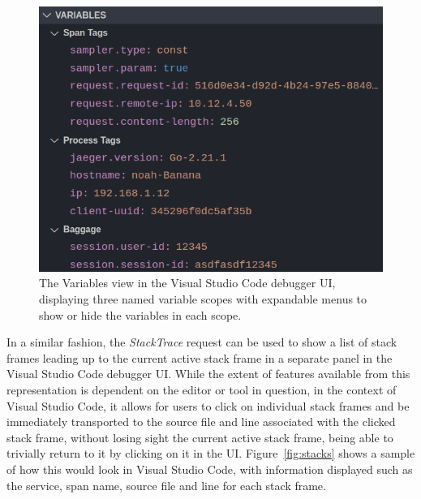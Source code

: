 \documentclass[12pt,pdftex,titlepage]{report}
\begin{document}
            \begin{figure}[htb!]
                \centering
                \includegraphics[scale=1.7]{scopes.png}
                \caption{The Variables view in the Visual Studio Code debugger UI, displaying three named variable scopes with expandable menus to show or hide the variables
                in each scope.}
                \label{fig:scopes}
            \end{figure}

            In a similar fashion, the \textit{StackTrace} request can be used to show a list of stack frames leading up to the current active stack frame in a separate panel in the Visual Studio Code debugger UI. While the extent of 
            features available from this representation is dependent on the editor or tool in question, in the context of Visual Studio Code, it allows for users to click on individual stack frames and be immediately transported 
            to the source file and line associated with the clicked stack frame, without losing sight the current active stack frame, being able to trivially return to it by clicking on it in the UI. Figure~\ref{fig:stacks} shows a 
            sample of how this would look in Visual Studio Code, with information displayed such as the service, span name, source file and line for each stack frame.
\end{document}

